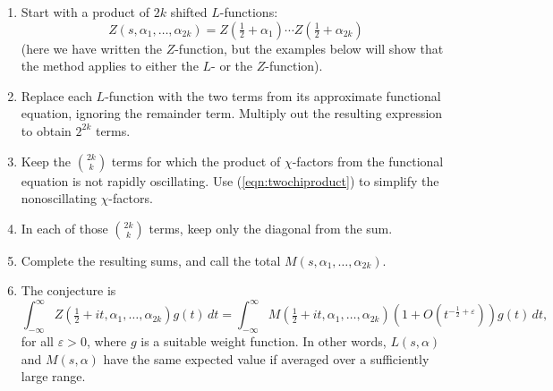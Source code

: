 \documentclass[12pt,letterpaper]{amsart}
\theoremstyle{plain}
\theoremstyle{definition}
\theoremstyle{remark}
\numberwithin{equation}{subsection}
\numberwithin{theorem}{subsection}
\numberwithin{table}{subsection}
\begin{document}
\begin{enumerate}
\item{}Start with a product of $2k$ shifted $L$-functions: 
\begin{equation}\label{eqn:firstZproduct}
Z(s,\alpha_1,\dots,\alpha_{2k}) =
Z(\tfrac 12 + \alpha_1)\cdots Z(\tfrac 12 + \alpha_{2k})
\end{equation}
(here we have written the $Z$-function, but the
examples below will show that the method applies to either
the $L$- or the $Z$-function).

\item{}Replace each $L$-function with the two terms from its
approximate functional equation, ignoring the remainder term.  
Multiply out the resulting
expression to obtain $2^{2k}$ terms.

\item{}Keep the $\binom{2k}{k}$ terms for which the product of $\chi$-factors from the
functional equation is not rapidly oscillating.
Use (\ref{eqn:twochiproduct}) to simplify the nonoscillating $\chi$-factors.

\item{}In each of those $\binom{2k}{k}$ terms, keep only the diagonal
from the sum.

\item{}Complete the resulting sums, and call the total 
$M(s,\alpha_1,\dots,\alpha_{2k})$.

\item{}The conjecture is
\begin{equation}
\int_{-\infty}^\infty Z(\tfrac12+it,\alpha_1,\dots,\alpha_{2k}) g(t) \,dt
=
\int_{-\infty}^\infty M(\tfrac12+it,\alpha_1,\dots,\alpha_{2k})
(1+O(t^{-\frac12 + \varepsilon})) g(t) \,dt ,
\end{equation}
for all $\varepsilon>0$, where $g$ is a suitable weight function.
In other words, $L(s,\alpha)$ and $M(s,\alpha)$ have the same 
expected value if averaged over a sufficiently large range.
\end{enumerate}
\end{document}
